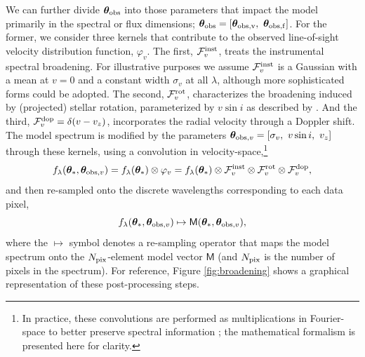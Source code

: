 \documentclass[iop,floatfix]{emulateapj}
\newcommand{\vM}{\mathsf{M}}
\newcommand{\flam}{f_\lambda}
\newcommand{\vt}{ {\bm \theta}}
\begin{document}
We can further divide $\vt_{\rm obs}$ into those parameters that impact the model primarily in the 
spectral or flux dimensions; $\vt_{\rm obs} = [\vt_{\rm obs, v}, \,\, \vt_{\rm obs, f}]$.  For the 
former, we consider three kernels that contribute to the observed line-of-sight velocity 
distribution function, $\varphi_v$.  The first, $\mathcal{F}_v^{\rm inst}$, treats the instrumental 
spectral broadening.  For illustrative purposes we assume $\mathcal{F}_v^{\rm inst}$ is a Gaussian 
with a mean at $v = 0$ and a constant width $\sigma_v$ at all $\lambda$, although more 
sophisticated forms could be adopted.  The second, $\mathcal{F}_v^{\rm rot}$, characterizes the 
broadening induced by (projected) stellar rotation, parameterized by $v\sin{i}$ as described by 
\citet[][his Eq.~18.14]{gray08}.  And the third, $\mathcal{F}_v^{\rm dop} = \delta(v-v_z)$, 
incorporates the radial velocity through a Doppler shift.  The model spectrum is modified by the 
parameters $\vt_{{\rm obs}, v} = [\sigma_v, \,\, v\sin{i}, \,\, v_z]$ through these kernels, using 
a convolution in velocity-space,\footnote{In practice, these convolutions are performed as 
multiplications in Fourier-space to better preserve spectral information \citep[cf.,][]{tonry79}; 
the mathematical formalism is presented here for clarity.}
\begin{equation}
\flam(\vt_{\ast}, \vt_{{\rm obs}, v}) = \flam(\vt_{\ast}) \otimes \varphi_v = \flam(\vt_{\ast}) \otimes \mathcal{F}_v^{\rm inst} \otimes \mathcal{F}_v^{\rm rot} \otimes \mathcal{F}_v^{\rm dop},
\label{eqn:broadening}
\end{equation}
and then re-sampled onto the discrete wavelengths corresponding to each data pixel, 
\begin{equation}
\flam(\vt_{\ast}, \vt_{{\rm obs}, v}) \mapsto \vM(\vt_{\ast}, \vt_{{\rm obs}, v}),
\label{eqn:resampling}
\end{equation}
where the $\mapsto$ symbol denotes a re-sampling operator that maps the model spectrum onto the 
$N_{\rm pix}$-element model vector $\vM$ (and $N_{\rm pix}$ is the number of pixels in the 
spectrum).  For reference, Figure \ref{fig:broadening} shows a graphical representation of these 
post-processing steps.
\end{document}
